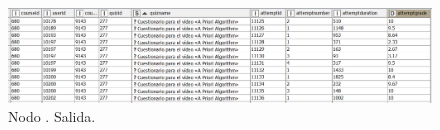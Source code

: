 \begin{figure}[!h]
	\centering
	\includegraphics[width=1\textwidth]{img/nodes_moodle_reports_quizzes_output.png}
	\caption{Nodo . Salida.}
	\label{fig:moodlereportsquizzes_output}
\end{figure}
\FloatBarrier
\hphantom{ }


